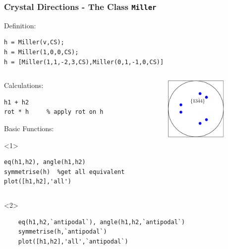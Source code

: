 \begin{frame}[fragile]
  \frametitle{Crystal Directions - The \MTEX Class \texttt{\bf Miller}}

  Definition:

\begin{lstlisting}
h = Miller(v,CS);
h = Miller(1,0,0,CS);
h = [Miller(1,1,-2,3,CS),Miller(0,1,-1,0,CS)]
\end{lstlisting}

\medskip

\begin{columns}
  \begin{column}{8.5cm}

    Calculations:

\begin{lstlisting}
h1 + h2
rot * h     % apply rot on h
\end{lstlisting}

    Basic Functions:

    \begin{onlyenv}<1>
\begin{lstlisting}
eq(h1,h2), angle(h1,h2)
symmetrise(h)  %get all equivalent 
plot([h1,h2],'all')
\end{lstlisting}
    \end{onlyenv}

	\end{column}
       
  \begin{column}{3cm}
    \includegraphics[width=3cm]{pic/miller}
  \end{column}
\end{columns}
	
	
	\begin{onlyenv}
	

	\begin{lstlisting}
	eq(h1,h2,`antipodal`), angle(h1,h2,`antipodal`)
	symmetrise(h,`antipodal`)
	plot([h1,h2],'all',`antipodal`)
	\end{lstlisting}
	
    
    \end{onlyenv}
 

\end{frame}



